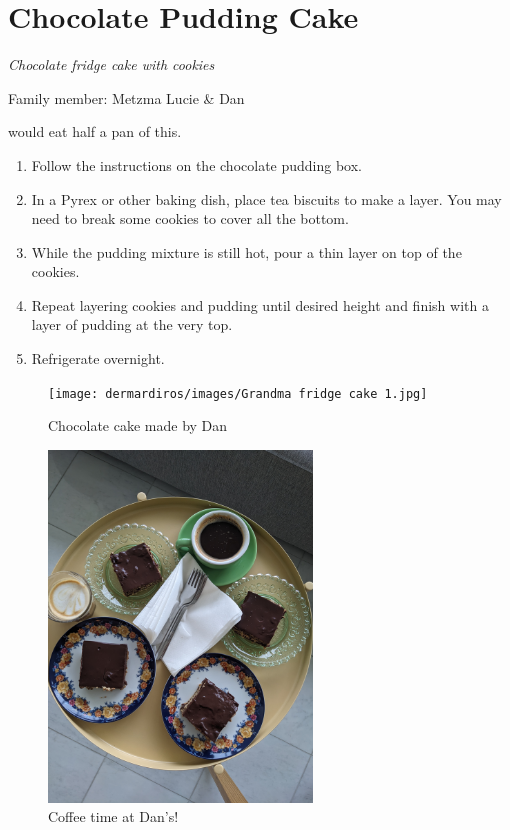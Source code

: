 \chapter{Chocolate Pudding Cake}
\label{ch:chocolatefridgecake}


\textit{Chocolate fridge cake with cookies}

Family member: Metzma Lucie \& Dan

 would eat half a pan of this.
\bigskip

\begin{enumerate}
    \item Follow the instructions on the chocolate pudding box.
    \item In a Pyrex or other baking dish, place tea biscuits to make a layer. You may need to break some cookies to cover all the bottom.
    \item While the pudding mixture is still hot, pour a thin layer on top of the cookies.
    \item Repeat layering cookies and pudding until desired height and finish with a layer of pudding at the very top.
    \item Refrigerate overnight.
\end{enumerate}

\begin{figure}
  \texttt{[image: dermardiros/images/Grandma fridge cake 1.jpg]}
  \caption{Chocolate cake made by Dan}
  \includegraphics[width=70mm]{dermardiros/images/Grandma fridge cake 2.jpg}
  \caption{Coffee time at Dan's!}
\end{figure}
